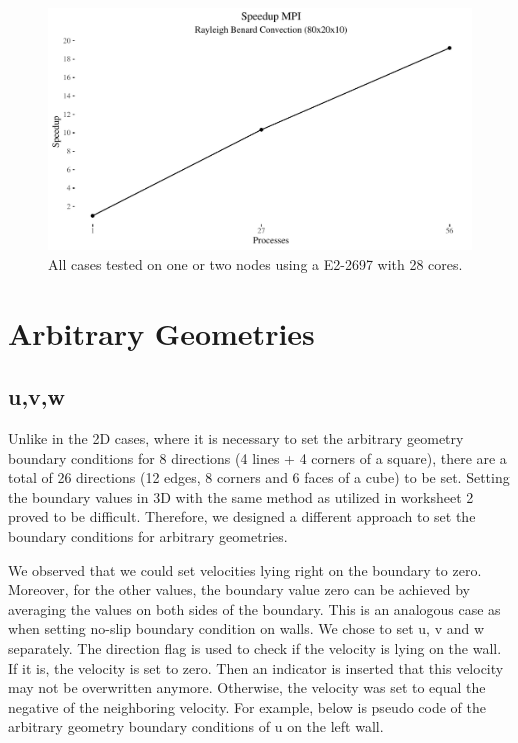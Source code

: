 \documentclass{article}%
\begin{document}
\begin{figure}[htb]
\centering
\includegraphics[width=1\linewidth]{../tests/graphs/speedup_MPI.pdf}
\caption{All cases tested on one or two nodes using a E2-2697 with 28 cores.}
\label{fig:speedup_MPI}
\end{figure}


\section{Arbitrary Geometries}
\subsection{u,v,w}

Unlike in the 2D cases, where it is necessary to set the arbitrary geometry boundary conditions for 8 directions (4 lines + 4 corners of a square), there are a total of 26 directions (12 edges, 8 corners and 6 faces of a cube) to be set. Setting the boundary values in 3D with the same method as utilized in worksheet 2 proved to be difficult.  Therefore, we designed a different approach to set the boundary conditions for arbitrary geometries.

We observed that we could set velocities lying right on the boundary to zero. Moreover, for the other values, the boundary value zero can be achieved by averaging the values on both sides of the boundary. This is an analogous case as when setting no-slip boundary condition on walls. We chose to set u, v and w separately. The direction flag is used to check if the velocity is lying on the wall. If it is, the velocity is set to zero. Then an indicator is inserted that this velocity may not be overwritten anymore. Otherwise, the velocity was set to equal the negative of the neighboring velocity. For example, below is pseudo code of the arbitrary geometry boundary conditions of u on the left wall.
\end{document}

